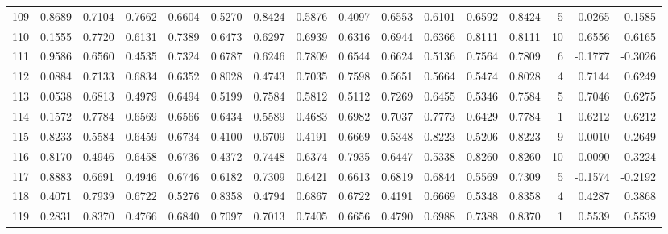 \begin{tabular}{lrrrrrrrrrrrrrrr}
109 &      0.8689 &  0.7104 &  0.7662 &  0.6604 &  0.5270 &  0.8424 &  0.5876 &  0.4097 &  0.6553 &  0.6101 &   0.6592 &     0.8424 &      5 &                   -0.0265 &                    -0.1585 \\
110 &      0.1555 &  0.7720 &  0.6131 &  0.7389 &  0.6473 &  0.6297 &  0.6939 &  0.6316 &  0.6944 &  0.6366 &   0.8111 &     0.8111 &     10 &                    0.6556 &                     0.6165 \\
111 &      0.9586 &  0.6560 &  0.4535 &  0.7324 &  0.6787 &  0.6246 &  0.7809 &  0.6544 &  0.6624 &  0.5136 &   0.7564 &     0.7809 &      6 &                   -0.1777 &                    -0.3026 \\
112 &      0.0884 &  0.7133 &  0.6834 &  0.6352 &  0.8028 &  0.4743 &  0.7035 &  0.7598 &  0.5651 &  0.5664 &   0.5474 &     0.8028 &      4 &                    0.7144 &                     0.6249 \\
113 &      0.0538 &  0.6813 &  0.4979 &  0.6494 &  0.5199 &  0.7584 &  0.5812 &  0.5112 &  0.7269 &  0.6455 &   0.5346 &     0.7584 &      5 &                    0.7046 &                     0.6275 \\
114 &      0.1572 &  0.7784 &  0.6569 &  0.6566 &  0.6434 &  0.5589 &  0.4683 &  0.6982 &  0.7037 &  0.7773 &   0.6429 &     0.7784 &      1 &                    0.6212 &                     0.6212 \\
115 &      0.8233 &  0.5584 &  0.6459 &  0.6734 &  0.4100 &  0.6709 &  0.4191 &  0.6669 &  0.5348 &  0.8223 &   0.5206 &     0.8223 &      9 &                   -0.0010 &                    -0.2649 \\
116 &      0.8170 &  0.4946 &  0.6458 &  0.6736 &  0.4372 &  0.7448 &  0.6374 &  0.7935 &  0.6447 &  0.5338 &   0.8260 &     0.8260 &     10 &                    0.0090 &                    -0.3224 \\
117 &      0.8883 &  0.6691 &  0.4946 &  0.6746 &  0.6182 &  0.7309 &  0.6421 &  0.6613 &  0.6819 &  0.6844 &   0.5569 &     0.7309 &      5 &                   -0.1574 &                    -0.2192 \\
118 &      0.4071 &  0.7939 &  0.6722 &  0.5276 &  0.8358 &  0.4794 &  0.6867 &  0.6722 &  0.4191 &  0.6669 &   0.5348 &     0.8358 &      4 &                    0.4287 &                     0.3868 \\
119 &      0.2831 &  0.8370 &  0.4766 &  0.6840 &  0.7097 &  0.7013 &  0.7405 &  0.6656 &  0.4790 &  0.6988 &   0.7388 &     0.8370 &      1 &                    0.5539 &                     0.5539 \\

\end{tabular}
